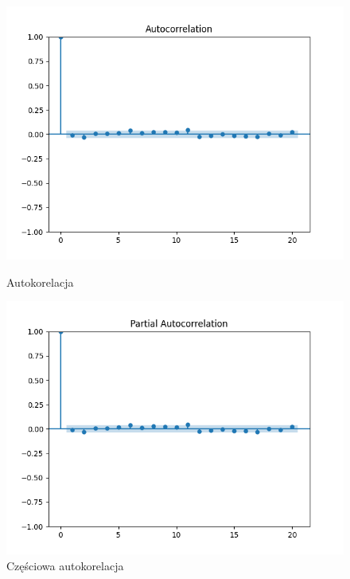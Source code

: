 \documentclass{article}
\theoremstyle{break}
\begin{document}
\begin{figure}[H]
	\begin{center}
		\begin{minipage}{0.49\linewidth}
			\centering
			\includegraphics[scale=0.49]{acf_res.png}
			\caption{Autokorelacja}
			\label{fig:acf_res}
		\end{minipage}
		\begin{minipage}{0.49\linewidth}
			\centering
			\includegraphics[scale=0.49]{pacf_res.png}
			\caption{Częściowa autokorelacja}
			\label{fig:pacf_res}
		\end{minipage}
	\end{center}
\end{figure}
\end{document}

